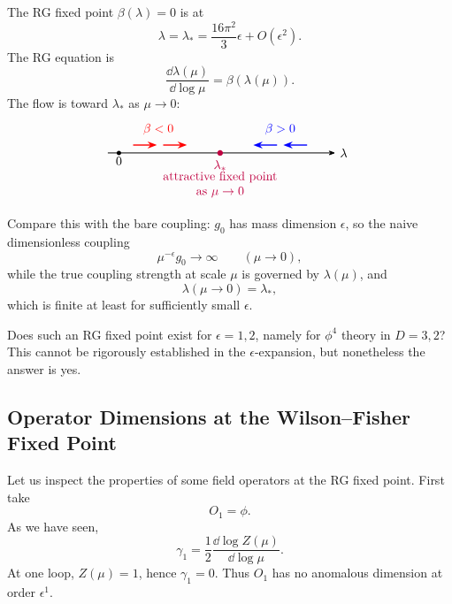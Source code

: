 The RG fixed point \(\beta(\lambda)=0\) is at
\[
  \lambda=\lambda_*
  =
  \frac{16\pi^2}{3}\epsilon+O(\epsilon^2).
\]
The RG equation is
\[
  \frac{\dd\lambda(\mu)}{\dd\log\mu}=\beta(\lambda(\mu)).
\]
The flow is toward \(\lambda_*\) as \(\mu\to0\):
\[
\begin{tikzpicture}[>=Stealth,baseline={(0,-0.6)},scale=0.9]
  \draw[->,line width=0.7pt] (0,0) -- (7.2,0) node[right] {\(\lambda\)};
  \fill (0.35,0) circle (2pt) node[below] {\(0\)};
  \fill[purple] (3.55,0) circle (2.5pt) node[below=0.25em] {\(\lambda_*\)};
  \draw[red,->,line width=1pt] (0.8,0.25) -- (1.55,0.25);
  \draw[red,->,line width=1pt] (1.75,0.25) -- (2.5,0.25);
  \draw[blue,->,line width=1pt] (6.3,0.25) -- (5.55,0.25);
  \draw[blue,->,line width=1pt] (5.35,0.25) -- (4.6,0.25);
  \node[red] at (1.6,0.75) {\(\beta<0\)};
  \node[blue] at (5.45,0.75) {\(\beta>0\)};
  \node[purple,align=center] at (3.55,-1.0)
    {attractive fixed point\\as \(\mu\to0\)};
\end{tikzpicture}
\]

Compare this with the bare coupling: \(g_0\) has mass dimension
\(\epsilon\), so the naive dimensionless coupling
\[
  \mu^{-\epsilon}g_0
  \longrightarrow
  \infty
  \qquad(\mu\to0),
\]
while the true coupling strength at scale \(\mu\) is governed by
\(\lambda(\mu)\), and
\[
  \lambda(\mu\to0)=\lambda_*,
\]
which is finite at least for sufficiently small \(\epsilon\).

Does such an RG fixed point exist for \(\epsilon=1,2\), namely for
\(\phi^4\) theory in \(D=3,2\)?  This cannot be rigorously established in the
\(\epsilon\)-expansion, but nonetheless the answer is yes.

\subsection{Operator Dimensions at the Wilson--Fisher Fixed Point}

Let us inspect the properties of some field operators at the RG fixed point.
First take
\[
  O_1=\phi.
\]
As we have seen,
\[
  \gamma_1=\frac12\frac{\dd\log Z(\mu)}{\dd\log\mu}.
\]
At one loop, \(Z(\mu)=1\), hence \(\gamma_1=0\).  Thus \(O_1\) has no
anomalous dimension at order \(\epsilon^1\).

